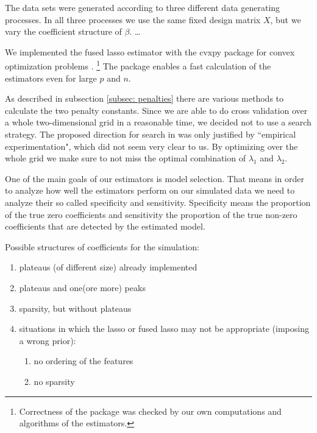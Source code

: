 \documentclass{article}
\theoremstyle{definition}
\begin{document}
The data sets were generated according to three different data generating processes. In all three processes we use the same fixed design matrix $X$, but we vary the coefficient structure of $\beta$. \ldots

We implemented the fused lasso estimator with the cvxpy package for convex optimization problems \citep{cvxpy}. \footnote{Correctness of the package was checked by our own computations and algorithms of the estimators.} The package enables a fast calculation of the estimators even for large $p$ and $n$.

As described in subsection \ref{subsec: penalties} there are various methods to calculate the two penalty constants. Since we are able to do cross validation over a whole two-dimensional grid in a reasonable time, we decided not to use a search strategy. The proposed direction for search in \citep{fused} was only justified by “empirical experimentation", which did not seem very clear to us. By optimizing over the whole grid we make sure to not miss the optimal combination of $\lambda_1$ and $\lambda_2$.

One of the main goals of our estimators is model selection. That means in order to analyze how well the estimators perform on our simulated data we need to analyze their so called specificity and sensitivity. Specificity means the proportion of the true zero coefficients and sensitivity the proportion of the true non-zero coefficients that are detected by the estimated model.

Possible structures of coefficients for the simulation:
\begin{enumerate}
	\item plateaus (of different size) already implemented
	\item plateaus and one(ore more) peaks
	\item sparsity, but without plateaus
	\item situations in which the lasso or fused lasso may not be appropriate (imposing a wrong prior):
	\begin{enumerate}
		\item no ordering of the features
		\item no sparsity
	\end{enumerate}
\end{enumerate}

\end{document}

